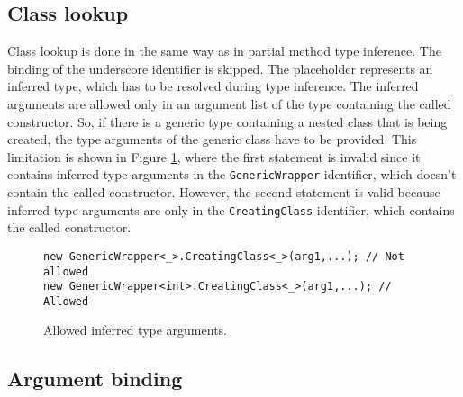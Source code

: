 \subsection{Class lookup}

Class lookup is done in the same way as in partial method type inference. 
The binding of the underscore identifier is skipped. 
The placeholder represents an inferred type, which has to be resolved during type inference. 
The inferred arguments are allowed only in an argument list of the type containing the called constructor.
So, if there is a generic type containing a nested class that is being created, the type arguments of the generic class have to be provided. 
This limitation is shown in Figure \ref{img59:TypeArgList}, where the first statement is invalid since it contains inferred type arguments in the \texttt{GenericWrapper} identifier, which doesn’t contain the called constructor. 
However, the second statement is valid because inferred type arguments are only in the \texttt{CreatingClass} identifier, which contains the called constructor.
\begin{figure}[h!]
\begin{lstlisting}[style=csharp, mathescape=true]
new GenericWrapper<_>.CreatingClass<_>(arg1,...); // Not allowed
new GenericWrapper<int>.CreatingClass<_>(arg1,...); // Allowed
\end{lstlisting}
\caption{Allowed inferred type arguments.}
\label{img59:TypeArgList}
\end{figure}

\subsection{Argument binding}

